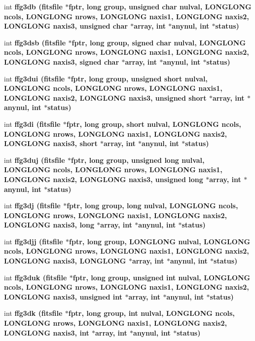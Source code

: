 \begin{CompactItemize}
\item 
int \bf{ffg3db} (\bf{fitsfile} $\ast$fptr, long group, unsigned char nulval, \bf{LONGLONG} ncols, \bf{LONGLONG} nrows, \bf{LONGLONG} naxis1, \bf{LONGLONG} naxis2, \bf{LONGLONG} naxis3, unsigned char $\ast$array, int $\ast$anynul, int $\ast$status)
\item 
int \bf{ffg3dsb} (\bf{fitsfile} $\ast$fptr, long group, signed char nulval, \bf{LONGLONG} ncols, \bf{LONGLONG} nrows, \bf{LONGLONG} naxis1, \bf{LONGLONG} naxis2, \bf{LONGLONG} naxis3, signed char $\ast$array, int $\ast$anynul, int $\ast$status)
\item 
int \bf{ffg3dui} (\bf{fitsfile} $\ast$fptr, long group, unsigned short nulval, \bf{LONGLONG} ncols, \bf{LONGLONG} nrows, \bf{LONGLONG} naxis1, \bf{LONGLONG} naxis2, \bf{LONGLONG} naxis3, unsigned short $\ast$array, int $\ast$anynul, int $\ast$status)
\item 
int \bf{ffg3di} (\bf{fitsfile} $\ast$fptr, long group, short nulval, \bf{LONGLONG} ncols, \bf{LONGLONG} nrows, \bf{LONGLONG} naxis1, \bf{LONGLONG} naxis2, \bf{LONGLONG} naxis3, short $\ast$array, int $\ast$anynul, int $\ast$status)
\item 
int \bf{ffg3duj} (\bf{fitsfile} $\ast$fptr, long group, unsigned long nulval, \bf{LONGLONG} ncols, \bf{LONGLONG} nrows, \bf{LONGLONG} naxis1, \bf{LONGLONG} naxis2, \bf{LONGLONG} naxis3, unsigned long $\ast$array, int $\ast$anynul, int $\ast$status)
\item 
int \bf{ffg3dj} (\bf{fitsfile} $\ast$fptr, long group, long nulval, \bf{LONGLONG} ncols, \bf{LONGLONG} nrows, \bf{LONGLONG} naxis1, \bf{LONGLONG} naxis2, \bf{LONGLONG} naxis3, long $\ast$array, int $\ast$anynul, int $\ast$status)
\item 
int \bf{ffg3djj} (\bf{fitsfile} $\ast$fptr, long group, \bf{LONGLONG} nulval, \bf{LONGLONG} ncols, \bf{LONGLONG} nrows, \bf{LONGLONG} naxis1, \bf{LONGLONG} naxis2, \bf{LONGLONG} naxis3, \bf{LONGLONG} $\ast$array, int $\ast$anynul, int $\ast$status)
\item 
int \bf{ffg3duk} (\bf{fitsfile} $\ast$fptr, long group, unsigned int nulval, \bf{LONGLONG} ncols, \bf{LONGLONG} nrows, \bf{LONGLONG} naxis1, \bf{LONGLONG} naxis2, \bf{LONGLONG} naxis3, unsigned int $\ast$array, int $\ast$anynul, int $\ast$status)
\item 
int \bf{ffg3dk} (\bf{fitsfile} $\ast$fptr, long group, int nulval, \bf{LONGLONG} ncols, \bf{LONGLONG} nrows, \bf{LONGLONG} naxis1, \bf{LONGLONG} naxis2, \bf{LONGLONG} naxis3, int $\ast$array, int $\ast$anynul, int $\ast$status)

\end{CompactItemize}
